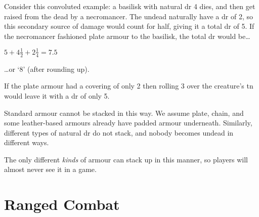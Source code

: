 \begin{multicols}{2}
Consider this convoluted example: a basilisk with natural \gls{dr} 4 dies, and then get raised from the dead by a necromancer.
The undead naturally have a \gls{dr} of 2, so this secondary source of damage would count for half, giving it a total \gls{dr} of 5.
If the necromancer fashioned plate armour to the basilisk, the total \gls{dr} would be\ldots

\begin{center}
{
  \LARGE $5 + $\Large$4\frac{1}{2} + $\normalsize$2\frac{1}{4} =  7.5$
}
\end{center}

\ldots or `8' (after rounding up).

If the plate armour had a covering of only 2 then rolling 3 over the creature's \gls{tn} would leave it with a \gls{dr} of only 5.

Standard armour cannot be stacked in this way.
We assume plate, chain, and some leather-based armours already have padded armour underneath.
Similarly, different types of natural \gls{dr} do not stack, and nobody becomes undead in different ways.

The only different \emph{kinds} of armour can stack up in this manner, so players will almost never see it in a game.

\end{multicols}

\section{Ranged Combat}

